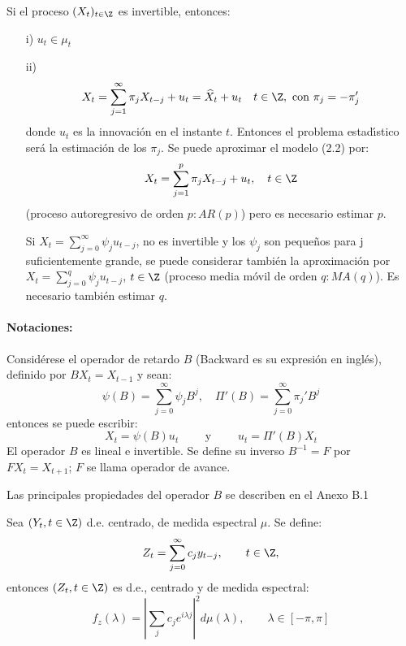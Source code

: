 \begin{observacion}
Si el proceso $(X_{t} )_{t\in \Z} $ es invertible, entonces:
\begin{enumerate}
 \item[i)] $u_{t} \in \mu_{t} $ 
 \item[ii)] \begin{equation}
        X_{t} =\sum_{j=1}^\infty {\pi_{j} X_{t-j} } +u_{t} =\widehat{X}_{t} +u_{t} \quad t\in \Z,\text{ con }\pi_{j} =-\pi_{j}'     
       \end{equation}
	donde $u_{t} $ es la innovaci\'{o}n en el instante $t$. Entonces el problema estad\'{\i}stico ser\'{a} la estimaci\'{o}n de los $\pi_{j} $. Se puede aproximar el modelo (2.2) por:
	\[
	 X_{t} =\sum_{j=1}^p \pi_{j} X_{t-j} +u_{t} ,\quad t\in \Z
	\]
	(proceso autoregresivo de orden $p: AR(p)$) pero es necesario estimar $p$.

Si $\displaystyle X_{t} =\sum_{j=0}^\infty {\psi_{j} u_{t-j} } $, no es invertible y los $\psi_{j}$ son peque\~{n}os para j suficientemente grande, se puede considerar tambi\'{e}n la aproximaci\'{o}n por $\displaystyle X_{t} =\sum_{j=0}^q {\psi_{j} u_{t-j} }$, $t\in \Z$ (proceso media m\'{o}vil de orden $q: MA(q)$). Es necesario tambi\'{e}n estimar $q$.
\end{enumerate}

\end{observacion}


\paragraph{Notaciones:} Consid\'{e}rese el operador de retardo $B$ (Backward es su expresi\'{o}n en ingl\'{e}s), definido por $BX_{t} =X_{t-1} $ y sean:
\[
\psi \left( B \right)=\sum_{j=0}^\infty {\psi_{j} B^{j}} ,
\quad
\Pi'\left( B \right)=\sum_{j=0}^\infty {\pi_{j}' } B^{j}
\]
entonces se puede escribir:
\[
 X_{t} =\psi \left( B \right)u_{t}\qquad\text{ y }\qquad u_{t} =\Pi'\left( B \right)X_{t}
\]
El operador $B$ es lineal e invertible. Se define su inverso $B^{-1}=F$ por 
$FX_{t} =X_{t+1} $; $F$ se llama operador de avance. 

Las principales propiedades del operador $B$ se describen en el Anexo B.1

\begin{teorema}
 Sea $\left( {Y_{t} ,t\in \Z} \right)$ d.e. centrado, de medida espectral $\mu $. Se define:
\[
Z_{t} =\sum_{j=0}^\infty {c_{j} y_{t-j} } ,\qquad t\in \Z,
\]
entonces $\left( {Z_{t} ,t\in \Z} \right)$ es d.e., centrado y de medida espectral:
\[
f_{z} \left( \lambda \right)=
\left| {\sum_j {c_{j} e^{i\lambda j}} } \right|^{2}d\mu \left( \lambda \right),\qquad \lambda \in \left[ 
{-\pi ,\pi } \right]
\]
\end{teorema}

